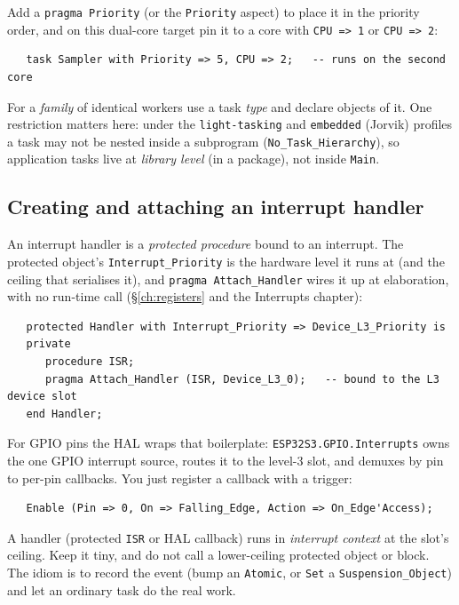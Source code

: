 Add a \texttt{pragma Priority} (or the \texttt{Priority} aspect) to place it in
the priority order, and on this dual-core target pin it to a core with
\texttt{CPU => 1} or \texttt{CPU => 2}:

\begin{lstlisting}
   task Sampler with Priority => 5, CPU => 2;   -- runs on the second core
\end{lstlisting}

For a \emph{family} of identical workers use a task \emph{type} and declare
objects of it. One restriction matters here: under the \texttt{light-tasking} and
\texttt{embedded} (Jorvik) profiles a task may not be nested inside a subprogram
(\texttt{No\_Task\_Hierarchy}), so application tasks live at \emph{library level}
(in a package), not inside \texttt{Main}.

\subsection{Creating and attaching an interrupt handler}

An interrupt handler is a \emph{protected procedure} bound to an interrupt. The
protected object's \texttt{Interrupt\_Priority} is the hardware level it runs at
(and the ceiling that serialises it), and \texttt{pragma Attach\_Handler} wires
it up at elaboration, with no run-time call (\S\ref{ch:registers} and the Interrupts
chapter):

\begin{lstlisting}
   protected Handler with Interrupt_Priority => Device_L3_Priority is
   private
      procedure ISR;
      pragma Attach_Handler (ISR, Device_L3_0);   -- bound to the L3 device slot
   end Handler;
\end{lstlisting}

For GPIO pins the HAL wraps that boilerplate: \texttt{ESP32S3.GPIO.Interrupts}
owns the one GPIO interrupt source, routes it to the level-3 slot, and demuxes by
pin to per-pin callbacks. You just register a callback with a trigger:

\begin{lstlisting}
   Enable (Pin => 0, On => Falling_Edge, Action => On_Edge'Access);
\end{lstlisting}

A handler (protected \texttt{ISR} or HAL callback) runs in \emph{interrupt
context} at the slot's ceiling. Keep it tiny, and do not call a lower-ceiling
protected object or block. The idiom is to record the event (bump an
\texttt{Atomic}, or \texttt{Set} a \texttt{Suspension\_Object}) and let an
ordinary task do the real work.

